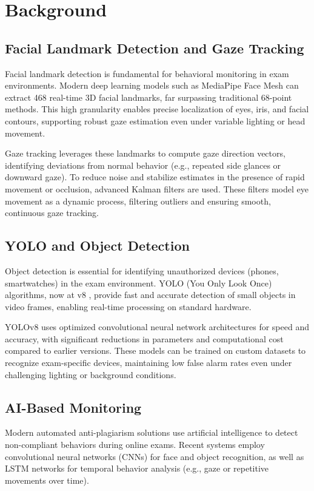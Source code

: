 \documentclass[conference]{IEEEtran}
\begin{document}
\section{Background}

\subsection{Facial Landmark Detection and Gaze Tracking}
Facial landmark detection is fundamental for behavioral monitoring in exam environments. Modern deep learning models such as MediaPipe Face Mesh\cite{jakhete2024comprehensive} can extract 468 real-time 3D facial landmarks, far surpassing traditional 68-point methods\cite{markerless2021,artfacepoints2022}. This high granularity enables precise localization of eyes, iris, and facial contours, supporting robust gaze estimation even under variable lighting or head movement.

Gaze tracking leverages these landmarks to compute gaze direction vectors, identifying deviations from normal behavior (e.g., repeated side glances or downward gaze). To reduce noise and stabilize estimates in the presence of rapid movement or occlusion, advanced Kalman filters are used\cite{aung2022real,jeong2014kalman,li2020hksiamfc}. These filters model eye movement as a dynamic process, filtering outliers and ensuring smooth, continuous gaze tracking.

\subsection{YOLO and Object Detection}
Object detection is essential for identifying unauthorized devices (phones, smartwatches) in the exam environment. YOLO (You Only Look Once) algorithms, now at v8 \cite{yi2023small}, provide fast and accurate detection of small objects in video frames, enabling real-time processing on standard hardware.

YOLOv8 uses optimized convolutional neural network architectures for speed and accuracy, with significant reductions in parameters and computational cost compared to earlier versions. These models can be trained on custom datasets to recognize exam-specific devices, maintaining low false alarm rates even under challenging lighting or background conditions.

\subsection{AI-Based Monitoring}
Modern automated anti-plagiarism solutions use artificial intelligence to detect non-compliant behaviors during online exams. Recent systems\cite{kaddoura2022,abbas2022review,alsabhan2023,nigam2021,ahmad2021} employ convolutional neural networks (CNNs) for face and object recognition, as well as LSTM networks for temporal behavior analysis (e.g., gaze or repetitive movements over time).
\end{document}
